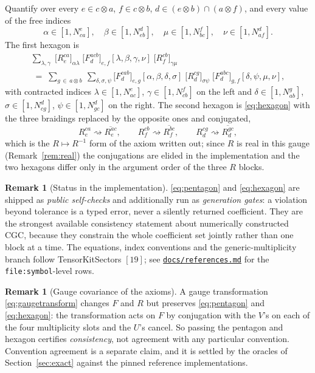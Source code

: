 \documentclass[11pt,a4paper]{article}
\theoremstyle{plain}
\theoremstyle{definition}
\newtheorem{remark}[theorem]{Remark}
\newcommand{\code}[1]{\texttt{#1}}
\newcommand{\refsmd}{\href{https://github.com/Ryo-wtnb11/racah/blob/main/docs/references.md}{\code{docs/references.md}}}
\begin{document}
Quantify over every
$e\in c\otimes a$, $f\in c\otimes b$, $d\in (e\otimes b)\cap(a\otimes f)$, and
every value of the free indices
\[
  \alpha\in[1,N^e_{ca}],\quad \beta\in[1,N^d_{eb}],\quad
  \mu\in[1,N^f_{bc}],\quad \nu\in[1,N^d_{af}].
\]
The first hexagon is
\begin{multline}\label{eq:hexagon}
  \sum_{\lambda,\gamma}\;
    \bigl[R^{ca}_{e}\bigr]_{\alpha\lambda}\;
    \bigl[F^{acb}_{d}\bigr]_{e,f}[\lambda,\beta,\gamma,\nu]\;
    \bigl[R^{cb}_{f}\bigr]_{\gamma\mu}
  \\[0.3em]
  \;=\;
  \sum_{g\,\in\, a\otimes b}\ \sum_{\delta,\sigma,\psi}
    \bigl[F^{cab}_{d}\bigr]_{e,g}[\alpha,\beta,\delta,\sigma]\;
    \bigl[R^{cg}_{d}\bigr]_{\sigma\psi}\;
    \bigl[F^{abc}_{d}\bigr]_{g,f}[\delta,\psi,\mu,\nu] ,
\end{multline}
with contracted indices $\lambda\in[1,N^e_{ac}]$, $\gamma\in[1,N^f_{cb}]$ on
the left and $\delta\in[1,N^g_{ab}]$, $\sigma\in[1,N^d_{cg}]$,
$\psi\in[1,N^d_{gc}]$ on the right. The second hexagon is
\eqref{eq:hexagon} with the three braidings replaced by the opposite ones and
conjugated,
\[
  R^{ca}_e \rightsquigarrow \overline{R^{ac}_e},\qquad
  R^{cb}_f \rightsquigarrow \overline{R^{bc}_f},\qquad
  R^{cg}_d \rightsquigarrow \overline{R^{gc}_d},
\]
which is the $R\mapsto R^{-1}$ form of the axiom written out; since $R$ is real
in this gauge (Remark~\ref{rem:real}) the conjugations are elided in the
implementation and the two hexagons differ only in the argument order of the
three $R$ blocks.

\begin{remark}[Status in the implementation]
\eqref{eq:pentagon} and \eqref{eq:hexagon} are shipped as \emph{public
self-checks} and additionally run as \emph{generation gates}: a violation
beyond tolerance is a typed error, never a silently returned coefficient. They
are the strongest available consistency statement about numerically constructed
CGC, because they constrain the whole coefficient set jointly rather than one
block at a time. The equations, index conventions and the generic-multiplicity
branch follow TensorKitSectors $[19]$; see \refsmd{} for the
\code{file:symbol}-level rows.
\end{remark}

\begin{remark}[Gauge covariance of the axioms]
A gauge transformation \eqref{eq:gaugetransform} changes $F$ and $R$ but
preserves \eqref{eq:pentagon} and \eqref{eq:hexagon}: the transformation acts
on $F$ by conjugation with the $V$'s on each of the four multiplicity slots and
the $U$'s cancel. So passing the pentagon and hexagon certifies
\emph{consistency}, not agreement with any particular convention. Convention
agreement is a separate claim, and it is settled by the oracles of
Section~\ref{sec:exact} against the pinned reference implementations.
\end{remark}
\end{document}
